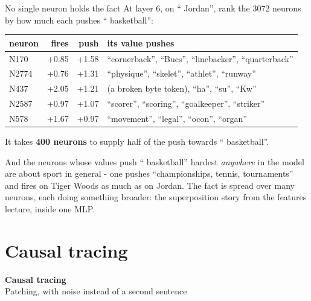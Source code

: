 \documentclass[aspectratio=169]{beamer}
\newcommand{\watchbox}[1]{%
  \begin{tcolorbox}[colback=armorange!12, colframe=armorange, boxrule=0.6pt, arc=2pt]
  #1
  \end{tcolorbox}}
\newcommand{\sectiontransition}[2]{%
  \begin{frame}[plain]
    \vfill
    \begin{center}
      {\Huge\bfseries\color{popblue} #1}\\[1.1em]
      {\large #2}
    \end{center}
    \vfill
  \end{frame}}
\begin{document}
\begin{frame}{No single neuron holds the fact}
  \vspace{0.4em}
  At layer 6, on `` Jordan'', rank the 3072 neurons by how much each pushes
  `` basketball'':

  \vspace{0.4em}
  \begin{center}
  \footnotesize
  \begin{tabular}{@{}lrrl@{}}
    \toprule
    neuron & fires & push & its value pushes\\
    \midrule
    N170 & +0.85 & +1.58 & ``cornerback'', ``Bucs'', ``linebacker'', ``quarterback''\\
    N2774 & +0.76 & +1.31 & ``physique'', ``skelet'', ``athlet'', ``runway''\\
    N437 & +2.05 & +1.21 & (a broken byte token), ``ha'', ``su'', ``Kw''\\
    N2587 & +0.97 & +1.07 & ``scorer'', ``scoring'', ``goalkeeper'', ``striker''\\
    N578 & +1.67 & +0.97 & ``movement'', ``legal'', ``ocon'', ``organ''\\
    \bottomrule
  \end{tabular}
  \end{center}

  \vspace{0.3em}
  It takes \textbf{400 neurons} to supply half of the push towards `` basketball''.

  \vspace{0.3em}
  \watchbox{\small And the neurons whose values push `` basketball'' hardest \emph{anywhere} in the
  model are about sport in general - one pushes ``championships, tennis, tournaments'' and fires
  on Tiger Woods as much as on Jordan. The fact is spread over many neurons, each doing something
  broader: the superposition story from the features lecture, inside one MLP.}
\end{frame}

\section{Causal tracing}
\sectiontransition{Causal tracing}{Patching, with noise instead of a second sentence}
\end{document}
